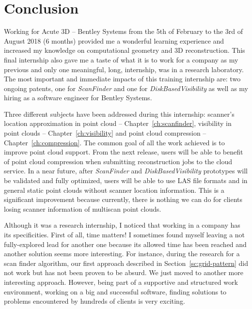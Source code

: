 \chapter{Conclusion}
\label{ch:conclusion}

Working for Acute 3D -- Bentley Systems from the 5th of February to the 3rd of August 2018 (6 months) provided me a wonderful learning experience and increased my knowledge on computational geometry and 3D reconstruction. This final internship also gave me a taste of what it is to work for a company as my previous and only one meaningful, long, internship, was in a research laboratory. The most important and immediate impacts of this training internship are: two ongoing patents, one for
\emph{ScanFinder} and one for \emph{DiskBasedVisibility} as well as my hiring as a software engineer for Bentley Systems.

Three different subjects have been addressed during this internship: scanner's location approximation in point cloud -- Chapter~\ref{ch:scanfinder}, visibility in point clouds -- Chapter~\ref{ch:visibility} and point cloud compression -- Chapter~\ref{ch:compression}. The common goal of all the work achieved is to improve \CC point cloud support. From the next \CC release, users will be able to benefit of point cloud compression when submitting reconstruction jobs to the cloud service. In a near future, after \emph{ScanFinder} and \emph{DiskBasedVisibility} prototypes will be validated and fully optimized, users will be able to use LAS file formats and in general static point clouds without scanner location information. This is a significant improvement because currently, there is nothing we can do for clients losing scanner information of multiscan point clouds.

Although it was a research internship, I noticed that working in a company has its specificities. First of all, time matters! I sometimes found myself leaving a not fully-explored lead for another one because its allowed time has been reached and another solution seems more interesting. For instance, during the research for a scan finder algorithm, our first approach described in Section~\ref{sc:grid-pattern} did not work but has not been proven to be absurd. We just moved to another more
interesting approach. However, being part of a supportive and structured work environment, working on a big and successful software, finding solutions to problems encountered by hundreds of clients is very exciting.

